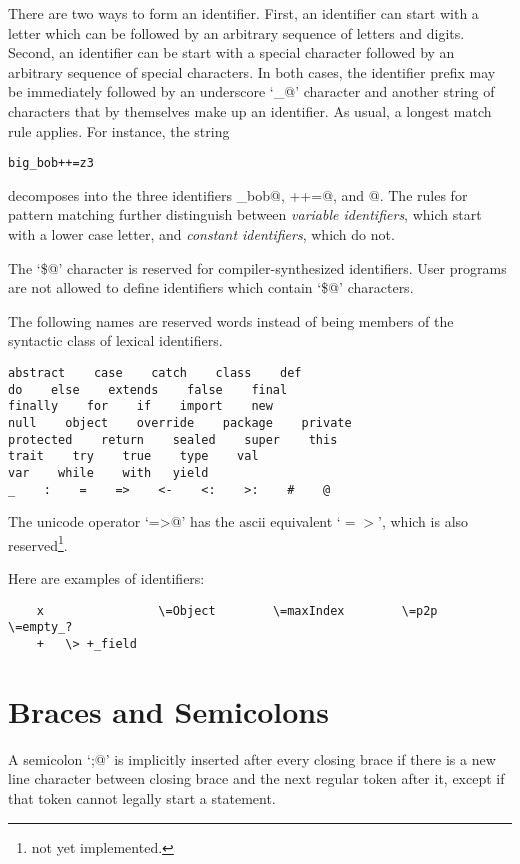 \documentclass[11pt]{report}
\newcommand{\notyet}{\footnote{not yet implemented.}}
\begin{document}
There are two ways to form an identifier. First, an identifier can
start with a letter which can be followed by an arbitrary sequence of
letters and digits. Second, an identifier can be start with a special
character followed by an arbitrary sequence of special characters.
In both cases, the identifier prefix may be immediately followed
by an underscore `\verb@_@' character and another string of characters
that by themselves make up an identifier.  As usual, a longest match
rule applies. For instance, the string

\begin{verbatim}
big_bob++=z3
\end{verbatim}

decomposes into the three identifiers \verb@big_bob@, \verb@++=@, and
@.  The rules for pattern matching further distinguish between
{\em variable identifiers}, which start with a lower case letter, and
{\em constant identifiers}, which do not.


The `\verb@\$@' character is reserved for compiler-synthesized identifiers.
User programs are not allowed to define identifiers which contain `\verb@\$@'
characters.

The following names are reserved words instead of being members of the
syntactic class \verb@id@ of lexical identifiers.

\begin{verbatim}
abstract    case    catch    class    def    
do    else    extends    false    final    
finally    for    if    import    new    
null    object    override    package    private    
protected    return    sealed    super    this    
trait    try    true    type    val    
var    while    with   yield
_    :    =    =>    <-    <:    >:    #    @
\end{verbatim}

The unicode operator `\verb@=>@' has the ascii equivalent
`$=>$', which is also reserved\notyet.

\example
Here are examples of identifiers:
\begin{verbatim}
    x                \=Object        \=maxIndex        \=p2p             \=empty_?
    +   \> +_field
\end{verbatim}

\section{Braces and Semicolons}

A semicolon `\verb@;@' is implicitly inserted after every closing brace
if there is a new line character between closing brace and the next
regular token after it, except if that token cannot legally start a
statement.
\end{document}
